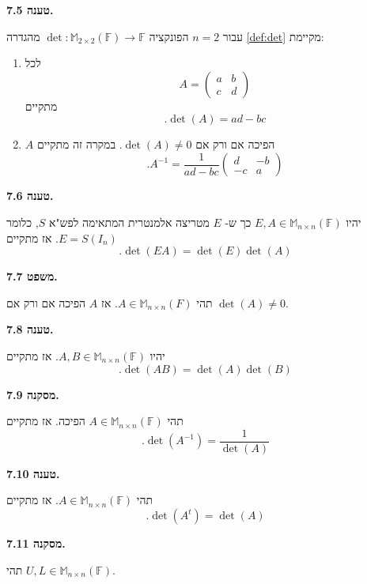 \documentclass[12pt]{report}
\theoremstyle{plain}
\theoremstyle{definition}
\newcommand{\F}{\mathbb{F}}
\newcommand{\M}{\mathbb{M}}
\newcommand{\0}{\mathbf{0}}
\begin{document}
\noindent\textbf{טענה 7.5.}

עבור
$n=2$
הפונקציה
$\det:\M_{2\times 2}(\F)\to\F$
מהגדרה
\ref{def:det}
מקיימת:
\begin{enumerate}[label=\alph*.]
\item
לכל
$$
A=\begin{pmatrix}
a & b \\
c & d
\end{pmatrix}
$$
מתקיים
$$
.\det(A)=ad-bc
$$

\item 
$A$
הפיכה אם ורק אם
$\det(A)\neq 0$. 
במקרה זה מתקיים
$$
.A^{-1}=\frac{1}{ad-bc}\begin{pmatrix}
d & -b \\
-c & a
\end{pmatrix}
$$


\end{enumerate}
\bigskip
\bigskip

\noindent\textbf{טענה 7.6.}

יהיו 
$E,A\in\M_{n\times n}(\F)$
כך ש-
$E$
מטריצה אלמנטרית המתאימה לפש"א
$S$,
כלומר
$E=S(I_n)$.
אז מתקיים
$$
.\det(EA)=\det(E)\det(A)
$$
\bigskip
\bigskip

\noindent\textbf{משפט 7.7.}

תהי
$A\in\M_{n\times n}(F)$.
אז 
$A$
הפיכה אם ורק אם
$\det(A)\neq 0$.
\bigskip
\bigskip

\noindent\textbf{טענה 7.8.}

יהיו 
$A,B\in\M_{n\times n}(\F)$.
אז מתקיים
$$
.\det(AB)=\det(A)\det(B)
$$
\bigskip
\bigskip

\noindent\textbf{מסקנה 7.9.}

תהי
$A\in\M_{n\times n}(\F)$
הפיכה. אז מתקיים
$$
.\det(A^{-1})=\frac{1}{\det(A)}
$$
\bigskip
\bigskip

\noindent\textbf{טענה 7.10.}

תהי
$A\in\M_{n\times n}(\F)$.
אז מתקיים
$$
.\det(A^t)=\det(A)
$$
\bigskip
\bigskip

\noindent\textbf{מסקנה 7.11.}

תהי
$U,L\in\M_{n\times n}(\F)$.
\end{document}
